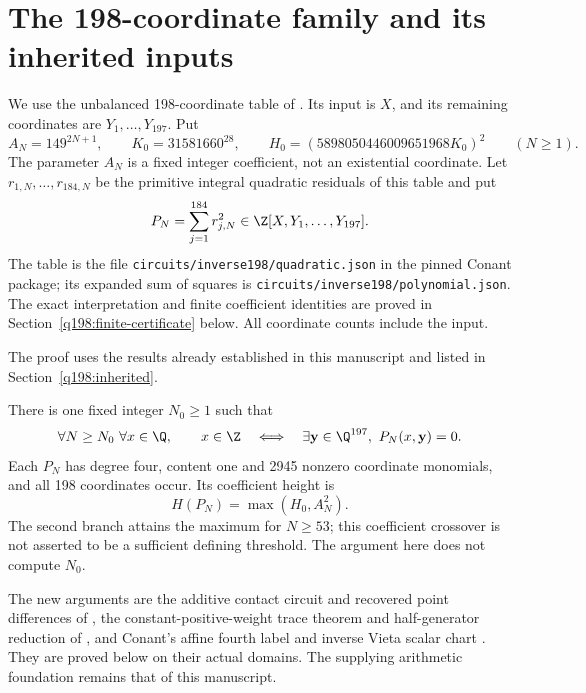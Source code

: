 \section{The 198-coordinate family and its inherited inputs}\label{q198:main}

We use the unbalanced 198-coordinate table of
\cite{q198-Conant198}. Its input is $X$, and its remaining coordinates
are $Y_1,\ldots,Y_{197}$. Put
\[
 A_N=149^{2N+1},\qquad K_0=31581660^{28},\qquad
 H_0=(5898050446009651968K_0)^2\qquad(N\ge1).
\]
The parameter $A_N$ is a fixed integer coefficient, not an existential
coordinate. Let $r_{1,N},\ldots,r_{184,N}$ be the primitive integral
quadratic residuals of this table and put
\[
 P_N=\sum_{j=1}^{184}r_{j,N}^2\in
 \Z[X,Y_1,\ldots,Y_{197}].
\]
The table is the file \nolinkurl{circuits/inverse198/quadratic.json}
in the pinned Conant package; its expanded sum of squares is
\nolinkurl{circuits/inverse198/polynomial.json}.
The exact interpretation and finite coefficient identities are proved
in Section~\ref{q198:finite-certificate} below. All coordinate counts
include the input.

The proof uses the results already established in this manuscript
and listed in Section~\ref{q198:inherited}.
\begin{theorem}\label{q198:family}
There is one fixed integer $N_0\ge1$ such that
\[
 \forall N\ge N_0\ \forall x\in\Q,\qquad
 x\in\Z\quad\Longleftrightarrow\quad
 \exists\mathbf y\in\Q^{197},\ P_N(x,\mathbf y)=0.
\]
Each $P_N$ has degree four, content one and 2945 nonzero coordinate
monomials, and all 198 coordinates occur. Its coefficient height is
\[
                         H(P_N)=\max(H_0,A_N^2).
\]
The second branch attains the maximum for $N\ge53$; this coefficient
crossover is not asserted to be a sufficient defining threshold.
The argument here does not compute $N_0$.
\end{theorem}

The new arguments are the additive contact circuit and recovered
point differences of \cite{q198-Brox212,q198-Brox204}, the
constant-positive-weight trace theorem and half-generator reduction
of \cite{q198-BroxWeighted}, and Conant's affine fourth label and
inverse Vieta scalar chart \cite{q198-Conant198}. They are proved
below on their actual domains. The supplying arithmetic foundation
remains that of this manuscript.


